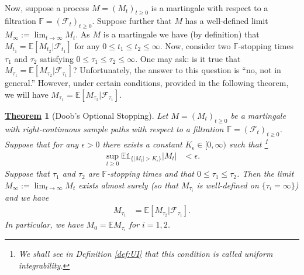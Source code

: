 \documentclass[12pt]{book}
\let\varepsilon\epsilon
\numberwithin{equation}{chapter}
\theoremstyle{plain}
\newtheorem{theorem}{\underline{Theorem}}
\numberwithin{theorem}{section}
\theoremstyle{definition}
\numberwithin{exercise}{chapter}
\newcommand{\<}{\langle}
\renewcommand{\>}{\rangle}
\renewcommand{\(}{\left(}
\renewcommand{\)}{\right)}
\renewcommand{\[}{\left[}
\renewcommand{\]}{\right]}
\newcommand\Eb{\mathds{E}}
\newcommand\Fb{\mathds{F}}
\newcommand\Ib{\mathds{1}} 	%
\newcommand\Pb{\mathds{P}}
\newcommand\Fc{\mathscr{F}}
\newcommand\eps{\varepsilon}
\newcommand\sig{\sigma}
\newcommand\del{\delta}
\newcommand\dd{\mathrm{d}}
\newcommand{\blu}[1]{\textcolor{blue}{#1}}
\begin{document}
%
\\[0.5em]
Now, suppose a process $M = (M_t)_{t \geq 0}$ is a martingale with respect to a filtration $\Fb = (\Fc_t)_{t \geq 0}$.
Suppose further that $M$ has a well-defined limit $M_\infty := \lim_{t \to \infty} M_t$.
As $M$ is a martingale we have (by definition) that $M_{t_1} = \Eb[ M_{t_2} | \Fc_{t_1}]$ for any $0 \leq t_1 \leq t_2 \leq \infty$.
Now, consider two $\Fb$-stopping times $\tau_1$ and $\tau_2$ satisfying $0 \leq \tau_1 \leq \tau_2 \leq \infty$.
One may ask: is it true that $M_{\tau_1} = \Eb[ M_{\tau_2} | \Fc_{\tau_1} ]$?
Unfortunately, the answer to this question is ``no, not in general.''  However, under certain conditions, provided in the following theorem, we will have $M_{\tau_1} = \Eb[ M_{\tau_2} | \Fc_{\tau_1} ]$.

\begin{theorem}[Doob's Optional Stopping]
\label{thm:sampling}
Let $M = (M_t)_{t \geq 0}$ be a martingale with right-continuous sample paths with respect to a filtration $\Fb = (\Fc_t)_{t \geq 0}$.
Suppose that for any $\eps > 0$ there exists a constant $K_\eps \in [0,\infty)$ such that
\footnote{We shall see in Definition \ref{def:UI} that this condition is called \textit{uniform integrability}.}
\begin{align}
\sup_{t \geq 0} \Eb \Ib_{\{|M_t|>K_\eps\}} |M_t|
	&< \eps . \label{eq:ui.condition}
\end{align}
Suppose that $\tau_1$ and $\tau_2$ are $\Fb$-stopping times and that $0 \leq \tau_1 \leq \tau_2$.
Then the limit $M_\infty := \lim_{t \to \infty} M_t$ exists almost surely (so that $M_{\tau_i}$ is well-defined on $\{ \tau_i = \infty \}$) and we have
\begin{align}
M_{\tau_1} 
	&=	\Eb[ M_{\tau_2} | \Fc_{\tau_1} ] . \label{eq:martingale.stopping}
\end{align}
In particular, we have $M_0 = \Eb M_{\tau_i}$ for $i = 1, 2$.
\end{theorem}
\end{document}
